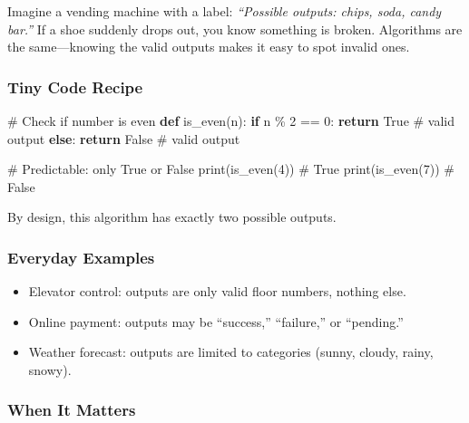 \documentclass[
  letterpaper,
  DIV=11,
  numbers=noendperiod]{scrreprt}
\newenvironment{Shaded}{\begin{snugshade}}{\end{snugshade}}
\newcommand{\BuiltInTok}[1]{\textcolor[rgb]{0.00,0.23,0.31}{#1}}
\newcommand{\CommentTok}[1]{\textcolor[rgb]{0.37,0.37,0.37}{#1}}
\newcommand{\ControlFlowTok}[1]{\textcolor[rgb]{0.00,0.23,0.31}{\textbf{#1}}}
\newcommand{\DecValTok}[1]{\textcolor[rgb]{0.68,0.00,0.00}{#1}}
\newcommand{\KeywordTok}[1]{\textcolor[rgb]{0.00,0.23,0.31}{\textbf{#1}}}
\newcommand{\NormalTok}[1]{\textcolor[rgb]{0.00,0.23,0.31}{#1}}
\newcommand{\OperatorTok}[1]{\textcolor[rgb]{0.37,0.37,0.37}{#1}}
\newcommand{\VariableTok}[1]{\textcolor[rgb]{0.07,0.07,0.07}{#1}}
\providecommand{\tightlist}{%
  \setlength{\itemsep}{0pt}\setlength{\parskip}{0pt}}
\begin{document}
Imagine a vending machine with a label: \emph{``Possible outputs: chips,
soda, candy bar.''} If a shoe suddenly drops out, you know something is
broken. Algorithms are the same---knowing the valid outputs makes it
easy to spot invalid ones.

\subsubsection{Tiny Code Recipe}\label{tiny-code-recipe-16}

\begin{Shaded}
\begin{Highlighting}[]
\CommentTok{\# Check if number is even}
\KeywordTok{def}\NormalTok{ is\_even(n):}
    \ControlFlowTok{if}\NormalTok{ n }\OperatorTok{\%} \DecValTok{2} \OperatorTok{==} \DecValTok{0}\NormalTok{:}
        \ControlFlowTok{return} \VariableTok{True}   \CommentTok{\# valid output}
    \ControlFlowTok{else}\NormalTok{:}
        \ControlFlowTok{return} \VariableTok{False}  \CommentTok{\# valid output}

\CommentTok{\# Predictable: only True or False}
\BuiltInTok{print}\NormalTok{(is\_even(}\DecValTok{4}\NormalTok{))  }\CommentTok{\# True}
\BuiltInTok{print}\NormalTok{(is\_even(}\DecValTok{7}\NormalTok{))  }\CommentTok{\# False}
\end{Highlighting}
\end{Shaded}

By design, this algorithm has exactly two possible outputs.

\subsubsection{Everyday Examples}\label{everyday-examples-16}

\begin{itemize}
\tightlist
\item
  Elevator control: outputs are only valid floor numbers, nothing else.
\item
  Online payment: outputs may be ``success,'' ``failure,'' or
  ``pending.''
\item
  Weather forecast: outputs are limited to categories (sunny, cloudy,
  rainy, snowy).
\end{itemize}

\subsubsection{When It Matters}\label{when-it-matters-15}
\end{document}
